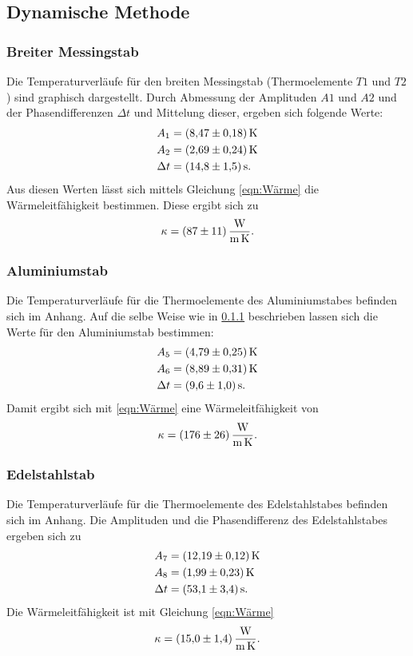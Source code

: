 \subsection{Dynamische Methode}
\subsubsection{Breiter Messingstab}
\label{sec:messing}
Die Temperaturverläufe für den breiten Messingstab (Thermoelemente $T1$ und $T2$)
sind graphisch dargestellt. %
\newline
Durch Abmessung der Amplituden $A1$ und $A2$ und der Phasendifferenzen $\Delta t$ 
und Mittelung dieser, ergeben sich folgende Werte:
\begin{align*}
    A_{1} &= \SI{8.47 \pm 0.18}{\kelvin} \\
    A_{2} &= \SI{2.69 \pm 0.24}{\kelvin} \\
    \Delta t &= \SI{14.8 \pm 1.5}{\second}.
\end{align*}
Aus diesen Werten lässt sich mittels Gleichung \eqref{eqn:Wärme} die Wärmeleitfähigkeit
bestimmen. Diese ergibt sich zu
\begin{equation*}
    \kappa = \SI{87 \pm 11}{\watt\per\meter\per\kelvin}.
\end{equation*}

\subsubsection{Aluminiumstab}
Die Temperaturverläufe für die Thermoelemente des Aluminiumstabes befinden sich im Anhang. %
Auf die selbe Weise wie in \ref{sec:messing} beschrieben lassen sich die Werte
für den Aluminiumstab bestimmen:
\begin{align*}
    A_{5} &= \SI{4.79 \pm 0.25}{\kelvin} \\
    A_{6} &= \SI{8.89 \pm 0.31}{\kelvin} \\
    \Delta t &= \SI{9.6 \pm 1.0}{\second}.
\end{align*}
Damit ergibt sich mit \eqref{eqn:Wärme} eine Wärmeleitfähigkeit von
\begin{equation*}
    \kappa = \SI{176 \pm 26}{\watt\per\meter\per\kelvin}.
\end{equation*}

\subsubsection{Edelstahlstab}
Die Temperaturverläufe für die Thermoelemente des Edelstahlstabes befinden sich im Anhang. %
Die Amplituden und die Phasendifferenz des Edelstahlstabes ergeben sich zu
\begin{align*}
    A_{7} &= \SI{12.19 \pm 0.12}{\kelvin} \\
    A_{8} &= \SI{1.99 \pm 0.23}{\kelvin} \\
    \Delta t &= \SI{53.1 \pm 3.4}{\second}.
\end{align*}
Die Wärmeleitfähigkeit ist mit Gleichung \eqref{eqn:Wärme}
\begin{equation*}
    \kappa = \SI{15.0 \pm 1.4}{\watt\per\meter\per\kelvin}.
\end{equation*}
